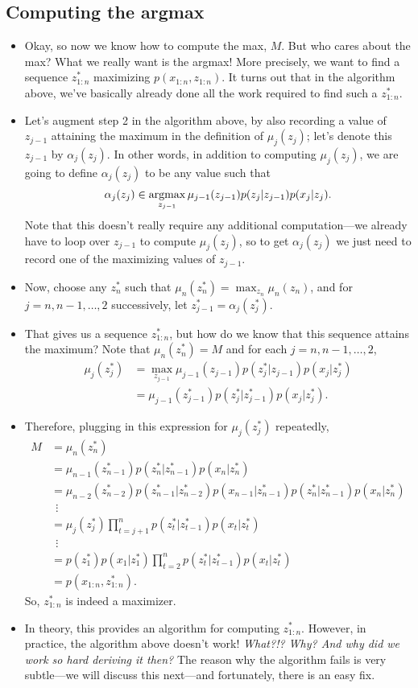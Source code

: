 \documentclass[12pt]{article}
\begin{document}
\subsection{Computing the argmax}
\begin{itemize}
\item Okay, so now we know how to compute the max, $M$. But who cares about the max? What we really want is the argmax! More precisely, we want to find a sequence $z_{1:n}^*$ maximizing $p(x_{1:n},z_{1:n})$. It turns out that in the algorithm above, we've basically already done all the work required to find such a $z_{1:n}^*$.
\item Let's augment step 2 in the algorithm above, by also recording a value of $z_{j-1}$ attaining the maximum in the definition of $\mu_j(z_j)$; let's denote this $z_{j-1}$ by $\alpha_j(z_j)$. In other words, in addition to computing $\mu_j(z_j)$, we are going to define $\alpha_j(z_j)$ to be any value such that
$$ \alpha_j(z_j) \in \operatorname*{argmax}_{z_{j-1}} \mu_{j-1}(z_{j-1}) p(z_j| z_{j-1}) p(x_j | z_j). $$
Note that this doesn't really require any additional computation---we already have to loop over $z_{j-1}$ to compute $\mu_j(z_j)$, so to get $\alpha_j(z_j)$ we just need to record one of the maximizing values of $z_{j-1}$.
\item Now, choose any $z_n^*$ such that $\mu_n(z_n^*) = \max_{z_n} \mu_n(z_n)$, and for $j = n,n -1,\ldots,2$ successively, let $z_{j -1}^* = \alpha_j(z_j^*)$. 
\item That gives us a sequence $z_{1:n}^*$, but how do we know that this sequence attains the maximum?  Note that $\mu_n(z_n^*) = M$ and for each $j = n,n -1,\ldots,2$,
\begin{align*}
\mu_j(z_j^*)
&= \max_{z_{j-1}} \mu_{j -1}(z_{j-1}) p(z_j^*| z_{j-1})p(x_j | z_j^*)\\  
&=\mu_{j -1}(z_{j -1}^*) p(z_j^*| z_{j -1}^*)p(x_j | z_j^*).
\end{align*}
\item Therefore, plugging in this expression for $\mu_j(z_j^*)$ repeatedly,
\begin{align*}
M & = \mu_n(z_n^*)\\
& = \mu_{n -1}(z_{n -1}^*) p(z_n^*| z_{n -1}^*) p(x_n | z_n^*)\\
& = \mu_{n -2}(z_{n -2}^*) p(z_{n -1}^*| z_{n -2}^*) p(x_{n -1} | z_{n -1}^*) p(z_n^*| z_{n -1}^*) p(x_n | z_n^*)\\
&~~\vdots\\
& = \mu_j(z_j^*) \prod_{t = j +1}^n p(z_t^*| z_{t -1}^*) p(x_t | z_t^*)\\
& ~~\vdots\\
& = p(z_1^*) p(x_1 | z_1^*) \prod_{t = 2}^n p(z_t^*| z_{t -1}^*) p(x_t | z_t^*)\\
& = p(x_{1:n},z_{1:n}^*).
\end{align*}
So, $z_{1:n}^*$ is indeed a maximizer.
\item In theory, this provides an algorithm for computing $z_{1:n}^*$. However, in practice, the algorithm above doesn't work! \textit{What?!? Why? And why did we work so hard deriving it then?} The reason why the algorithm fails is very subtle---we will discuss this next---and fortunately, there is an easy fix.
\end{itemize}
\end{document}

